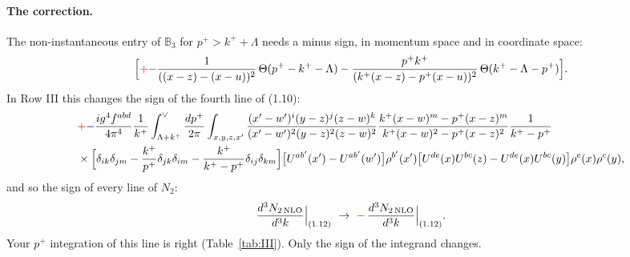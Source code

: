 \documentclass[10pt]{article}
\numberwithin{equation}{section}
\def\mf#1{\mathbb{#1}}
\newcommand{\old}[1]{{\color{red}#1}}
\newcommand{\new}[1]{{\color{blue}#1}}
\begin{document}
\paragraph{The correction.} The non-instantaneous entry of $\mf B_3$ for $p^+>k^++\Lambda$ needs a minus sign, in momentum space and in coordinate space:
\begin{equation}
\Big[\old{+}\new{-}\frac{1}{((x-z)-(x-u))^2}\,\Theta(p^+-k^+-\Lambda)-\frac{p^+k^+}{(k^+(x-z)-p^+(x-u))^2}\,\Theta(k^+-\Lambda-p^+)\Big].
\end{equation}
In Row III this changes the sign of the fourth line of (1.10):
\begin{align}
&\old{+}\new{-}\frac{ig^4f^{abd}}{4\pi^4}\frac{1}{k^+}\int_{\Lambda+k^+}^{\vee}\frac{dp^+}{2\pi}\int_{x,y,z,x'}\frac{(x'-w')^i(y-z)^j(z-w)^k}{(x'-w')^2(y-z)^2(z-w)^2}\frac{k^+(x-w)^m-p^+(x-z)^m}{k^+(x-w)^2-p^+(x-z)^2}\frac{1}{k^+-p^+}\notag\\
&\times\Big[\delta_{ik}\delta_{jm}-\frac{k^+}{p^+}\delta_{jk}\delta_{im}-\frac{k^+}{k^+-p^+}\delta_{ij}\delta_{km}\Big]\big[U^{ab'}(x')-U^{ab'}(w')\big]\rho^{b'}(x')\big[U^{de}(x)U^{bc}(z)-U^{de}(x)U^{bc}(y)\big]\rho^e(x)\rho^c(y),
\end{align}
and so the sign of every line of $N_2$:
\begin{equation}
\frac{d^3N_{2\,\rm NLO}}{d^3k}\Big|_{(1.12)}\ \to\ \new{-}\,\frac{d^3N_{2\,\rm NLO}}{d^3k}\Big|_{(1.12)}.
\end{equation}
Your $p^+$ integration of this line is right (Table~\ref{tab:III}). Only the sign of the integrand changes.
\end{document}
